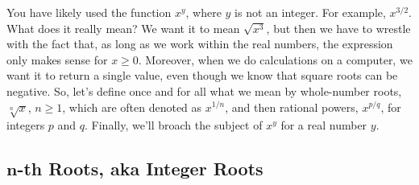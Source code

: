 You have likely used the function $x^y$, where $y$ is not an integer. For example, $x^{3/2}$. What does it really mean? We want it to mean $\sqrt{x^3}$, but then we have to wrestle with the fact that, as long as we work within the real numbers, the expression only makes sense for $x\ge 0$. Moreover, when we do calculations on a computer, we want it to return a single value, even though we know that square roots can be negative. So, let's define once and for all what we mean by whole-number roots, $\sqrt[n]{x}$, $n \ge 1$, which are often denoted as $x^{1/n}$, and then rational powers, $x^{p/q}$, for integers $p$ and $q$. Finally, we'll broach the subject of $x^y$ for a real number $y$. 

\subsection{\texorpdfstring{$\bm{n}$-th Roots, aka Integer Roots}{n-th Roots, aka Integer Roots}}

